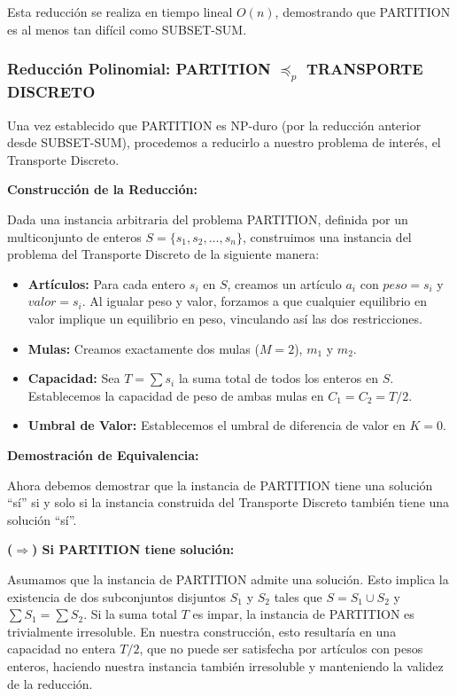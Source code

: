 \documentclass[12pt, a4paper]{article}
\begin{document}
    Esta reducción se realiza en tiempo lineal $O(n)$, demostrando que PARTITION es al menos tan difícil como SUBSET-SUM.

    \subsubsection{Reducción Polinomial: PARTITION $\preceq_p$ TRANSPORTE DISCRETO}
    Una vez establecido que PARTITION es NP-duro (por la reducción anterior desde SUBSET-SUM), procedemos a reducirlo a nuestro problema de interés, el Transporte Discreto.

    \textbf{Construcción de la Reducción:}

    Dada una instancia arbitraria del problema PARTITION, definida por un multiconjunto de enteros $S = \{s_1, s_2, \ldots, s_n\}$, construimos una instancia del problema del Transporte Discreto de la siguiente manera:

    \begin{itemize}
        \item \textbf{Artículos:} Para cada entero $s_i$ en $S$, creamos un artículo $a_i$ con $peso = s_i$ y $valor = s_i$. Al igualar peso y valor, forzamos a que cualquier equilibrio en valor implique un equilibrio en peso, vinculando así las dos restricciones.
        \item \textbf{Mulas:} Creamos exactamente dos mulas ($M = 2$), $m_1$ y $m_2$.
        \item \textbf{Capacidad:} Sea $T = \sum s_i$ la suma total de todos los enteros en $S$. Establecemos la capacidad de peso de ambas mulas en $C_1 = C_2 = T/2$.
        \item \textbf{Umbral de Valor:} Establecemos el umbral de diferencia de valor en $K = 0$.
    \end{itemize}

    \textbf{Demostración de Equivalencia:}

    Ahora debemos demostrar que la instancia de PARTITION tiene una solución ``sí'' si y solo si la instancia construida del Transporte Discreto también tiene una solución ``sí''.

    \textbf{($\Rightarrow$) Si PARTITION tiene solución:}

    Asumamos que la instancia de PARTITION admite una solución. Esto implica la existencia de dos subconjuntos disjuntos $S_1$ y $S_2$ tales que $S = S_1 \cup S_2$ y $\sum S_1 = \sum S_2$. Si la suma total $T$ es impar, la instancia de PARTITION es trivialmente irresoluble. En nuestra construcción, esto resultaría en una capacidad no entera $T/2$, que no puede ser satisfecha por artículos con pesos enteros, haciendo nuestra instancia también irresoluble y manteniendo la validez de la reducción.
\end{document}
